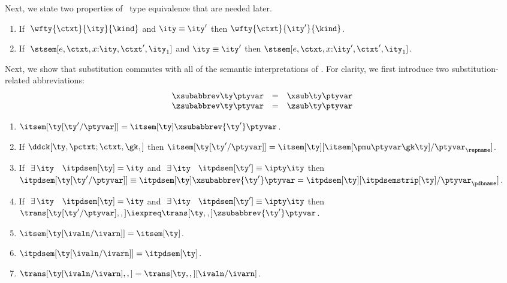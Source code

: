 Next, we state two properties of \fomega\ type equivalence that are
needed later.
\begin{lemma}
  \begin{enumerate}
  \item If $\;\wfty{\ctxt} {\ity} {\kind}$ and $\ity \equiv \ity'$ then
    $\wfty{\ctxt} {\ity'} {\kind}$. \label{lemma:fomega-eq-ty-kinding}
  \item If $\;\stsem[e,{\ctxt,x{:}\ity,\ctxt'},\ity_1]$ and $\ity \equiv
    \ity'$ then $\stsem[e,{\ctxt,x{:}\ity',\ctxt'},\ity_1]$. \label{lemma:fomega-eq-hyp-typing}
  \end{enumerate}
\label{lemma:fomega-ty-eq-props}
\end{lemma}

Next, we show that substitution commutes with all of the
semantic interpretations of \ddc{}. For clarity, we first introduce
two substitution-related abbreviations:
\[
\begin{array}{lll}
\xsubabbrev \ty \ptyvar & = & \xsub \ty \ptyvar\\
\zsubabbrev \ty \ptyvar & = & \zsub \ty \ptyvar
\end{array}
\]  

\begin{lemma}
  \begin{enumerate}
  \item $\itsem[{\ty[\ty'/\ptyvar]}] = \itsem[\ty]\xsubabbrev {\ty'} \ptyvar$.
  \item If $\ddck[\ty,\pctxt;\ctxt,\gk,]$ then $\itsem[{\ty[\ty'/\ptyvar]}] = 
    \itsem[\ty][\itsem[\pmu \ptyvar \gk \ty]/\ptyvar_\repname]$.
  \item If $\ \exists\,\ity$ \suchthat\ $\itpdsem[\ty] = \ity$ and
    $\ \exists\,\ity$ \suchthat\ $\itpdsem[\ty'] \equiv {\ipty \ity}$
then $\itpdsem[{\ty[\ty'/\ptyvar]}] \equiv
    \itpdsem[\ty]\xsubabbrev {\ty'} \ptyvar = 
    \itpdsem[\ty][\itpdsemstrip[\ty]/\ptyvar_\pdbname]$.
  \item If $\ \exists\,\ity$ \suchthat\ $\itpdsem[\ty] = \ity$ and
    $\ \exists\,\ity$ \suchthat\ $\itpdsem[\ty'] \equiv {\ipty \ity}$
then $\trans[{\ty[\ty'/\ptyvar]},,] \iexpreq
    \trans[\ty,,]\zsubabbrev {\ty'} \ptyvar$.
  \item $\itsem[{\ty[\ivaln/\ivarn]}] = \itsem[\ty]$.
  \item $\itpdsem[{\ty[\ivaln/\ivarn]}] = \itpdsem[\ty]$.
  \item $\trans[{\ty[\ivaln/\ivarn]},,] = \trans[\ty,,][\ivaln/\ivarn]$.
  \end{enumerate}
\label{lemma:subst-comm}
\end{lemma}

